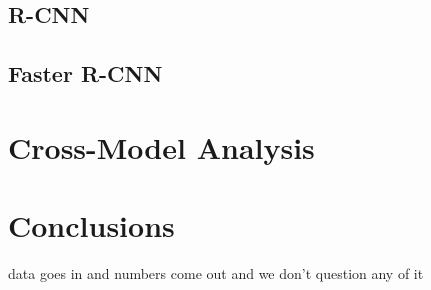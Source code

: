 \documentclass[12pt, landscape]{article}
\begin{document}
\begin{multicols}{3}
\subsection{R-CNN}
\subsection{Faster R-CNN}

\section{Cross-Model Analysis}
\section{Conclusions}
data goes in and numbers come out and we don't question any of it




\nocite{*}
\end{multicols}
\end{document}
